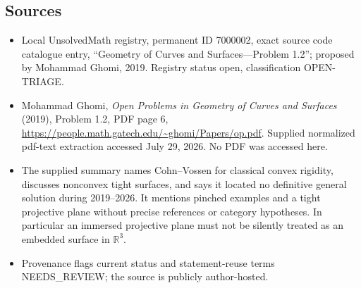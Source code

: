 \documentclass[11pt]{article}
\newcommand{\R}{\mathbb{R}}
\begin{document}
\subsection{Sources}
\begin{itemize}
\item Local UnsolvedMath registry, permanent ID 7000002, exact source code catalogue entry, ``Geometry of Curves and Surfaces---Problem 1.2''; proposed by Mohammad Ghomi, 2019. Registry status open, classification OPEN-TRIAGE.
\item Mohammad Ghomi, \emph{Open Problems in Geometry of Curves and Surfaces} (2019), Problem 1.2, PDF page 6, \url{https://people.math.gatech.edu/~ghomi/Papers/op.pdf}. Supplied normalized pdf-text extraction accessed July 29, 2026. No PDF was accessed here.
\item The supplied summary names Cohn--Vossen for classical convex rigidity, discusses nonconvex tight surfaces, and says it located no definitive general solution during 2019--2026. It mentions pinched examples and a tight projective plane without precise references or category hypotheses. In particular an immersed projective plane must not be silently treated as an embedded surface in $\R^3$.
\item Provenance flags current status and statement-reuse terms NEEDS\_REVIEW; the source is publicly author-hosted.
\end{itemize}
\end{document}
